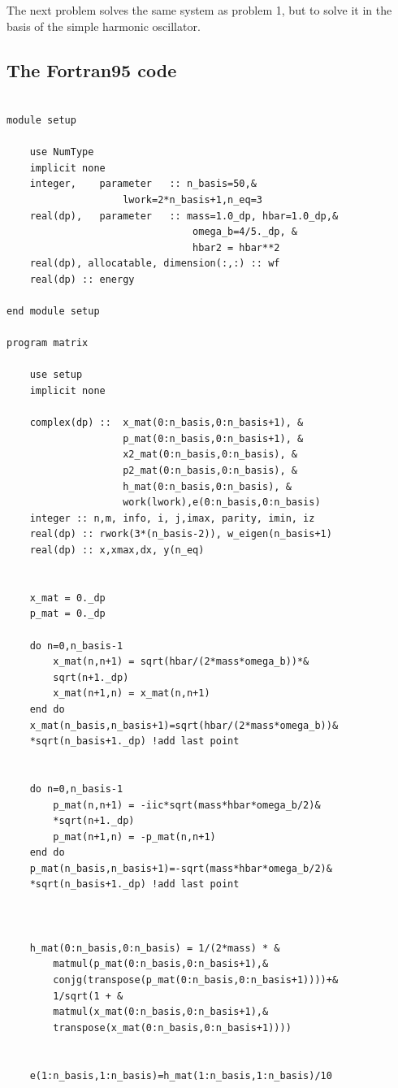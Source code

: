 \documentclass[12pt]{article}
\begin{document}
The next problem solves the same system as problem 1, but to solve it in the basis of the simple harmonic oscillator.

\subsection{The Fortran95 code}

\begin{lstlisting}[frame=single,caption={ {\tt mtest.f95}},label=module]

module setup

	use NumType
	implicit none
	integer,	parameter	:: n_basis=50,&
					lwork=2*n_basis+1,n_eq=3
	real(dp),	parameter	:: mass=1.0_dp, hbar=1.0_dp,&
							  	omega_b=4/5._dp, &
                                hbar2 = hbar**2
    real(dp), allocatable, dimension(:,:) :: wf
    real(dp) :: energy

end module setup

program matrix

	use setup
	implicit none

	complex(dp) ::	x_mat(0:n_basis,0:n_basis+1), &
					p_mat(0:n_basis,0:n_basis+1), &
					x2_mat(0:n_basis,0:n_basis), &
					p2_mat(0:n_basis,0:n_basis), &
					h_mat(0:n_basis,0:n_basis), &
                    work(lwork),e(0:n_basis,0:n_basis)
    integer :: n,m, info, i, j,imax, parity, imin, iz
    real(dp) :: rwork(3*(n_basis-2)), w_eigen(n_basis+1)
    real(dp) :: x,xmax,dx, y(n_eq)


	x_mat = 0._dp
    p_mat = 0._dp

	do n=0,n_basis-1
		x_mat(n,n+1) = sqrt(hbar/(2*mass*omega_b))*&
		sqrt(n+1._dp)
		x_mat(n+1,n) = x_mat(n,n+1)		
	end do
	x_mat(n_basis,n_basis+1)=sqrt(hbar/(2*mass*omega_b))&
	*sqrt(n_basis+1._dp) !add last point


    do n=0,n_basis-1
        p_mat(n,n+1) = -iic*sqrt(mass*hbar*omega_b/2)&
        *sqrt(n+1._dp)
        p_mat(n+1,n) = -p_mat(n,n+1)     
    end do
    p_mat(n_basis,n_basis+1)=-sqrt(mass*hbar*omega_b/2)&
    *sqrt(n_basis+1._dp) !add last point



    h_mat(0:n_basis,0:n_basis) = 1/(2*mass) * &
        matmul(p_mat(0:n_basis,0:n_basis+1),&
        conjg(transpose(p_mat(0:n_basis,0:n_basis+1))))+&
        1/sqrt(1 + &
        matmul(x_mat(0:n_basis,0:n_basis+1),&
        transpose(x_mat(0:n_basis,0:n_basis+1))))


    e(1:n_basis,1:n_basis)=h_mat(1:n_basis,1:n_basis)/10


\end{lstlisting}
\end{document}
